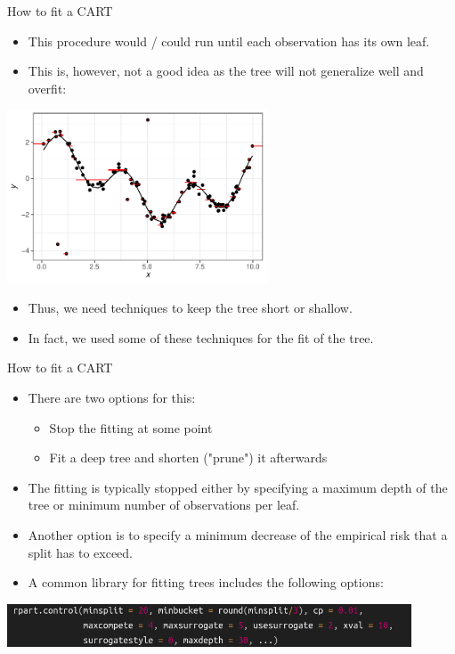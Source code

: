 \documentclass[11pt,compress,t,notes=noshow, xcolor=table]{beamer}
\begin{document}
\begin{vbframe}{How to fit a CART}
\begin{itemize}
\item This procedure would / could run until each observation has its own leaf.
\item This is, however, not a good idea as the tree will not generalize well and overfit:
\end{itemize}

{\centering \includegraphics[width=0.58\textwidth]{figure/tree-overfitting-prediction.pdf} 

}

\begin{itemize}
\item Thus, we need techniques to keep the tree short or shallow.
\item In fact, we used some of these techniques for the fit of the tree.
\end{itemize}

\end{vbframe}
\begin{vbframe}{How to fit a CART}
\begin{itemize}
\item There are two options for this:
\begin{itemize}
\item Stop the fitting at some point
\item Fit a deep tree and shorten ("prune") it afterwards
\end{itemize}
\item The fitting is typically stopped either by specifying a maximum depth of the tree or minimum number of observations per leaf.
\item Another option is to specify a minimum decrease of the empirical risk that a split has to exceed.
\item A common library for fitting trees includes the following options:
\end{itemize}

{\centering \includegraphics[width=0.9\textwidth]{figure_man/rpart.control-options.png} 

}

\end{vbframe} 
\end{document}
